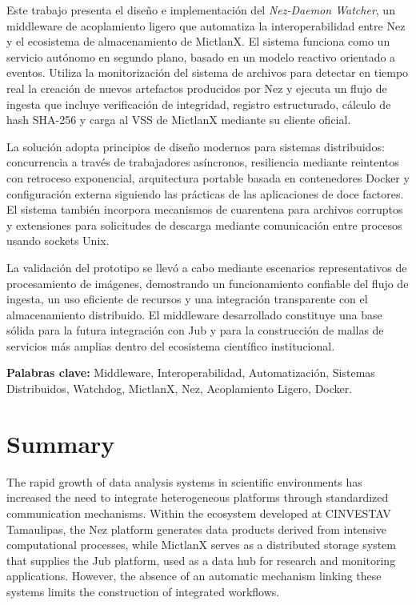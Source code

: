 \documentclass[12pt]{article}
\begin{document}
Este trabajo presenta el dise\~no e implementaci\'on del \textit{Nez-Daemon Watcher}, un middleware de acoplamiento ligero que automatiza la interoperabilidad entre Nez y el ecosistema de almacenamiento de MictlanX. El sistema funciona como un servicio aut\'onomo en segundo plano, basado en un modelo reactivo orientado a eventos. Utiliza la monitorizaci\'on del sistema de archivos para detectar en tiempo real la creaci\'on de nuevos artefactos producidos por Nez y ejecuta un flujo de ingesta que incluye verificaci\'on de integridad, registro estructurado, c\'alculo de hash SHA-256 y carga al VSS de MictlanX mediante su cliente oficial.

La soluci\'on adopta principios de dise\~no modernos para sistemas distribuidos: concurrencia a trav\'es de trabajadores as\'incronos, resiliencia mediante reintentos con retroceso exponencial, arquitectura portable basada en contenedores Docker y configuraci\'on externa siguiendo las pr\'acticas de las aplicaciones de doce factores. El sistema tambi\'en incorpora mecanismos de cuarentena para archivos corruptos y extensiones para solicitudes de descarga mediante comunicaci\'on entre procesos usando sockets Unix.

La validaci\'on del prototipo se llev\'o a cabo mediante escenarios representativos de procesamiento de im\'agenes, demostrando un funcionamiento confiable del flujo de ingesta, un uso eficiente de recursos y una integraci\'on transparente con el almacenamiento distribuido. El middleware desarrollado constituye una base s\'olida para la futura integraci\'on con Jub y para la construcci\'on de mallas de servicios m\'as amplias dentro del ecosistema cient\'ifico institucional.

\textbf{Palabras clave:} Middleware, Interoperabilidad, Automatizaci\'on, Sistemas Distribuidos, Watchdog, MictlanX, Nez, Acoplamiento Ligero, Docker.



\clearpage
\section*{\centering Summary}
%
The rapid growth of data analysis systems in scientific environments has increased the need to integrate heterogeneous platforms through standardized communication mechanisms. Within the ecosystem developed at CINVESTAV Tamaulipas, the Nez platform generates data products derived from intensive computational processes, while MictlanX serves as a distributed storage system that supplies the Jub platform, used as a data hub for research and monitoring applications. However, the absence of an automatic mechanism linking these systems limits the construction of integrated workflows.
\end{document}
